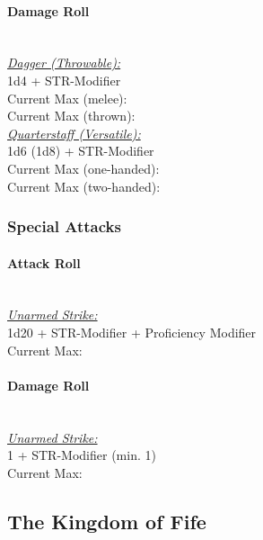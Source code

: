 \documentclass[letterpaper,openany,oneside,twocolumn]{book}
\begin{document}
\paragraph*{Damage Roll}\hfill\\
\underline{\textit{Dagger (Throwable):}}\\
1d4 + STR-Modifier\\
\indent Current Max (melee): \\
\indent Current Max (thrown): 
\\
\underline{\textit{Quarterstaff (Versatile):}}\\
1d6 (1d8) + STR-Modifier\\
\indent Current Max (one-handed): \\
\indent Current Max (two-handed): 
\subsubsection*{Special Attacks}
\paragraph*{Attack Roll}\hfill\\
\underline{\textit{Unarmed Strike:}}\\
1d20 + STR-Modifier + Proficiency Modifier\\
\indent Current Max: 
\paragraph*{Damage Roll}\hfill\\
\underline{\textit{Unarmed Strike:}}\\
1 + STR-Modifier (min. 1)\\
\indent Current Max: 

\vfill\eject

\subsection*{The Kingdom of Fife}
\end{document}
